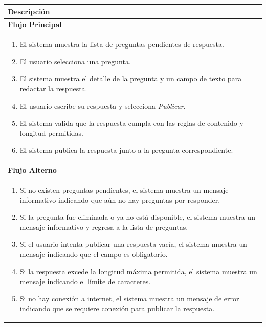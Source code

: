 \begin{table}[H]
\centering
\begin{tabular}{p{15.5cm}}\toprule \textbf{Descripción} \\
\midrule
\textbf{Flujo Principal} \\[2pt]
\begin{enumerate}
\item El sistema muestra la lista de preguntas pendientes de respuesta.
\item El usuario selecciona una pregunta.
\item El sistema muestra el detalle de la pregunta y un campo de texto para
      redactar la respuesta.
\item El usuario escribe su respuesta y selecciona \textit{Publicar}.
\item El sistema valida que la respuesta cumpla con las reglas de contenido y
      longitud permitidas.
\item El sistema publica la respuesta junto a la pregunta correspondiente.
\end{enumerate} \\
\midrule
\textbf{Flujo Alterno} \\[2pt]
\begin{enumerate}
\item[2a.] Si no existen preguntas pendientes, el sistema muestra un mensaje
    informativo indicando que aún no hay preguntas por responder.
\item[3a.] Si la pregunta fue eliminada o ya no está disponible, el sistema
    muestra un mensaje informativo y regresa a la lista de preguntas.
\item[5a.] Si el usuario intenta publicar una respuesta vacía, el sistema
    muestra un mensaje indicando que el campo es obligatorio.
\item[6a.] Si la respuesta excede la longitud máxima permitida, el sistema
    muestra un mensaje indicando el límite de caracteres.
\item[7a.] Si no hay conexión a internet, el sistema muestra un mensaje de error
    indicando que se requiere conexión para publicar la respuesta.
\end{enumerate}
\\
\bottomrule
\end{tabular}
\end{table}